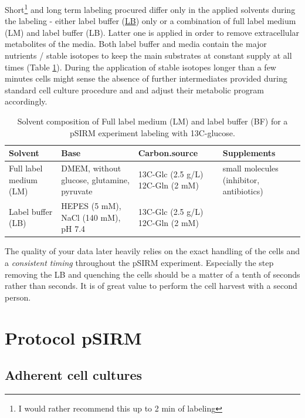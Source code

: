 \documentclass[]{book}
\let\rmarkdownfootnote\footnote%
\def\footnote{\protect\rmarkdownfootnote}
\theoremstyle{definition}
\theoremstyle{definition}
\theoremstyle{definition}
\theoremstyle{remark}
\begin{document}
Short\footnote{I would rather recommend this up to 2 min of labeling}
and long term labeling procured differ only in the applied solvents
during the labeling - either label buffer
(\protect\hyperlink{washingbuffer}{LB}) only or a combination of full
label medium (LM) and label buffer (LB). Latter one is applied in order
to remove extracellular metabolites of the media. Both label buffer and
media contain the major nutrients / stable isotopes to keep the main
substrates at constant supply at all times (Table \ref{tab:solvent}).
During the application of stable isotopes longer than a few minutes
cells might sense the absence of further intermediates provided during
standard cell culture procedure and and adjust their metabolic program
accordingly.

\begin{table}[t]

\caption{\label{tab:solvent}Solvent composition of Full label medium (LM) and label buffer (BF) for a pSIRM experiment labeling with 13C-glucose.}
\centering
\begin{tabular}{llll}
\toprule
Solvent & Base & Carbon.source & Supplements\\
\midrule
Full label medium (LM) & DMEM, without glucose, glutamine, pyruvate & 13C-Glc (2.5 g/L)
12C-Gln (2 mM) & small molecules 
(inhibitor, antibiotics)\\
Label buffer (LB) & HEPES (5 mM), NaCl (140 mM), pH 7.4 & 13C-Glc (2.5 g/L)
12C-Gln (2 mM) & \\
\bottomrule
\end{tabular}
\end{table}

The quality of your data later heavily relies on the exact handling of
the cells and a \emph{consistent timing} throughout the pSIRM
experiment. Especially the step removing the LB and quenching the cells
should be a matter of a tenth of seconds rather than seconds. It is of
great value to perform the cell harvest with a second person.

\section{Protocol pSIRM}\label{protocol-psirm}

\hypertarget{psirm:adherent}{\subsection{Adherent cell
cultures}\label{psirm:adherent}}
\end{document}
